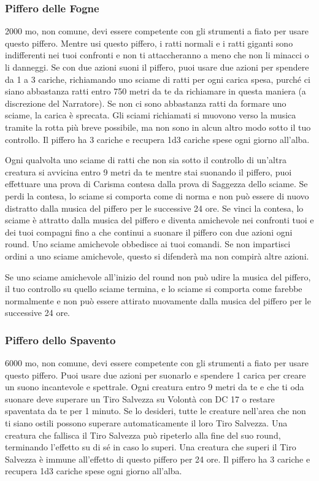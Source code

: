 \begin{multicols}{2}
	\subsubsection*{Piffero delle Fogne}
	2000 mo, non comune, devi essere competente con gli strumenti a fiato per usare questo piffero. Mentre usi questo piffero, i ratti normali e i ratti giganti sono indifferenti nei tuoi confronti e non ti attaccheranno a meno che non li minacci o li danneggi. Se con due azioni suoni il piffero, puoi usare due azioni per spendere da 1 a 3 cariche, richiamando uno sciame di ratti per ogni carica spesa, purché ci siano abbastanza ratti entro 750 metri da te da richiamare in questa maniera (a discrezione del Narratore). Se non ci sono abbastanza ratti da formare uno sciame, la carica è sprecata. Gli sciami richiamati si muovono verso la musica tramite la rotta più breve possibile, ma non sono in alcun altro modo sotto il tuo controllo. Il piffero ha 3 cariche e recupera 1d3 cariche spese ogni giorno all'alba.

	Ogni qualvolta uno sciame di ratti che non sia sotto il controllo di un'altra creatura si avvicina entro 9 metri da te mentre stai suonando il piffero, puoi effettuare una prova di Carisma contesa dalla prova di Saggezza dello sciame. Se perdi la contesa, lo sciame si comporta come di norma e non può essere di nuovo distratto dalla musica del piffero per le successive 24 ore. Se vinci la contesa, lo sciame è attratto dalla musica del piffero e diventa amichevole nei confronti tuoi e dei tuoi compagni fino a che continui a suonare il piffero con due azioni ogni round. Uno sciame amichevole obbedisce ai tuoi comandi. Se non impartisci ordini a uno sciame amichevole, questo si difenderà ma non compirà altre azioni.

	Se uno sciame amichevole all'inizio del round non può udire la musica del piffero, il tuo controllo su quello sciame termina, e lo sciame si comporta come farebbe normalmente e non può essere attirato nuovamente dalla musica del piffero per le successive 24 ore.

	\subsubsection*{Piffero dello Spavento}
	6000 mo, non comune, devi essere competente con gli strumenti a fiato per usare questo piffero. Puoi usare due azioni per suonarlo e spendere 1 carica per creare un suono incantevole e spettrale. Ogni creatura entro 9 metri da te e che ti oda suonare deve superare un Tiro Salvezza su Volontà con DC 17 o restare spaventata da te per 1 minuto. Se lo desideri, tutte le creature nell'area che non ti siano ostili possono superare automaticamente il loro Tiro Salvezza. Una creatura che fallisca il Tiro Salvezza può ripeterlo alla fine del suo round, terminando l'effetto su di sé in caso lo superi. Una creatura che superi il Tiro Salvezza è immune all'effetto di questo piffero per 24 ore. Il piffero ha 3 cariche e recupera 1d3 cariche spese ogni giorno all'alba.


\end{multicols}
